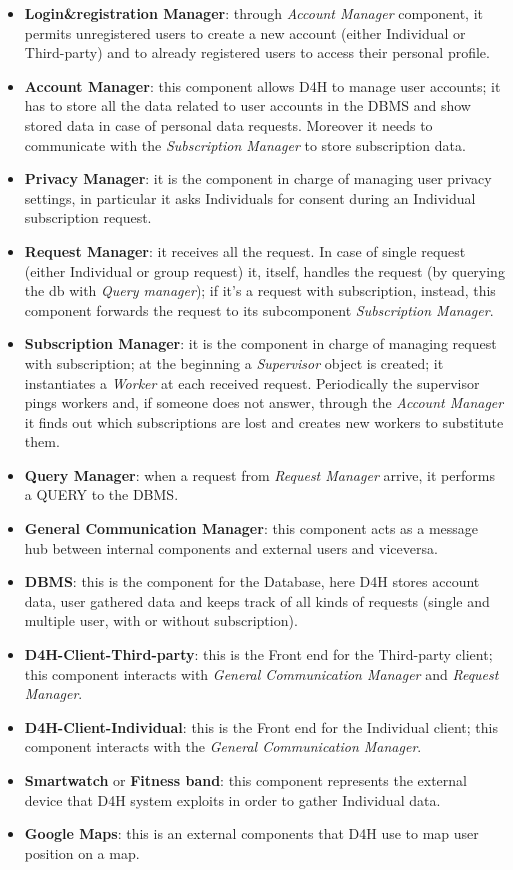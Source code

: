 \begin{itemize}
    \item \textbf{Login\&registration Manager}:  through \emph{Account Manager}  component, it permits unregistered users to create a new account (either Individual or Third-party) and to already registered users to access their personal profile.
    \item \textbf{Account Manager}: this component allows D4H to manage user accounts; it has to store all the data related to user accounts in the DBMS and show stored data in case of personal data requests. Moreover it needs to communicate with the \emph{Subscription Manager} to store subscription data.
    \item \textbf{Privacy Manager}: it is the component in charge of managing user privacy settings, in particular it asks Individuals for consent during an Individual subscription request.
    \item \textbf{Request Manager}: it receives all the request. In case of single request (either Individual or group request) it, itself, handles the request (by querying the db with \emph{Query manager}); if it's a request with subscription, instead, this component forwards the request to its subcomponent \emph{Subscription Manager}.
    \item \textbf{Subscription Manager}: it is the component in charge of managing request with subscription; at the beginning a \emph{Supervisor} object is created; it instantiates a \emph{Worker} at each received request. Periodically the supervisor pings workers and, if someone does not answer, through the \emph{Account Manager} it finds out which subscriptions are lost and creates new workers to substitute them. 
    \item \textbf{Query Manager}: when a request from \emph{Request Manager} arrive, it performs a QUERY to the DBMS.
    \item \textbf{General Communication Manager}: this component acts as a message hub between internal components and external users and viceversa.
    \item \textbf{DBMS}: this is the component for the Database, here D4H stores account data, user gathered data and keeps track of all kinds of requests (single and multiple user, with or without subscription).
    \item \textbf{D4H-Client-Third-party}: this is the Front end for the Third-party client; this component interacts with \emph{General Communication Manager} and \emph{Request Manager}.
    \item \textbf{D4H-Client-Individual}: this is the Front end for the Individual client; this component interacts with the \emph{General Communication Manager}.
    \item \textbf{Smartwatch} or \textbf{Fitness band}: this component represents the external device that D4H system exploits in order to gather Individual data.
    \item \textbf{Google Maps}: this is an external components that D4H use to map user position on a map.
\end{itemize}


